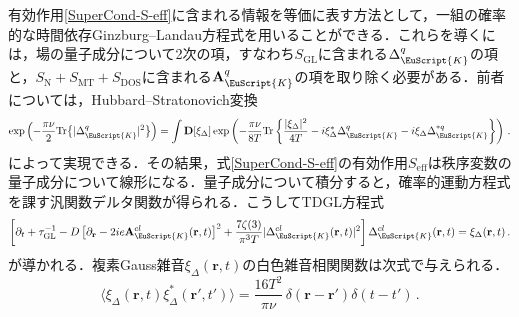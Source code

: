 \documentclass[a4paper,11pt]{ltjsarticle}
\def\D{\mathbf{D}}
\def\rt{(\mathbf{r},t)}
\begin{document}
有効作用\eqref{SuperCond-S-eff}に含まれる情報を等価に表す方法として，一組の確率的な時間依存Ginzburg--Landau方程式を用いることができる．これらを導くには，場の量子成分について2次の項，すなわち$S_{\mathrm{GL}}$に含まれる$\Delta^{q}_{\EuScript{K}}$の項と，$S_{\mathrm{N}}+S_{\mathrm{MT}}+S_{\mathrm{DOS}}$に含まれる$\mathbf{A}^{q}_{\EuScript{K}}$の項を取り除く必要がある．前者については，Hubbard--Stratonovich変換
\begin{equation}
\exp\left(-{\pi\nu\over 2}
\mathrm{Tr}\big\{|\Delta^{q}_{\EuScript{K}}|^{2}\big\}\right)=\int\D
[\xi_{\Delta}]\exp\left(-\frac{\pi\nu}{8T}\mathrm{Tr}\left\{
\frac{|\xi_{\Delta}|^{2}}{4T}
-i\xi^{*}_{\Delta}\Delta^{q}_{\EuScript{K}}-i\xi_{\Delta}
\Delta^{*q}_{\EuScript{K}}\right\} \right)\,.
\end{equation}
によって実現できる．その結果，式\eqref{SuperCond-S-eff}の有効作用$S_{\mathrm{eff}}$は秩序変数の量子成分について線形になる．量子成分について積分すると，確率的運動方程式を課す汎関数デルタ関数が得られる．こうしてTDGL方程式
\begin{equation}\label{SuperCond-KTDGL}
\left[\partial_{t}+\tau^{-1}_{\mathrm{GL}}-D\,
\big[\partial_{\mathbf{r}}-2ie\mathbf{A}^{cl}_{\EuScript{K}}\rt\big]^{2}
+\frac{7\zeta(3)}{\pi^{3}T}|\Delta^{cl}_{\EuScript{K}}\rt|^{2}\right]\Delta^{cl}_{\EuScript{K}}\rt=
\xi_{\Delta}\rt\,.
\end{equation}
が導かれる．複素Gauss雑音$\xi_{\Delta}\rt$の白色雑音相関関数は次式で与えられる．
\begin{equation}\label{SuperCond-xi-Delta}
\langle\xi_{\Delta}\rt\xi^{*}_{\Delta}(\mathbf{r}',t')\rangle=\frac{16T^{2}}{\pi\nu}\,
\delta(\mathbf{r}-\mathbf{r}')\delta(t-t')\,.
\end{equation}
\end{document}
